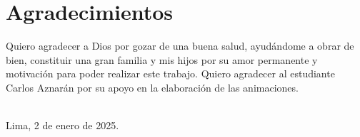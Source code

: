 \section*{Agradecimientos}

Quiero agradecer a Dios por gozar de una buena salud, ayudándome a
obrar de bien, constituir una gran familia y mis hijos por su amor
permanente y motivación para poder realizar este trabajo.
Quiero agradecer al estudiante Carlos Aznarán por su apoyo en la
elaboración de las animaciones.

\begin{flushright}
  \nameone \\
  Lima, 2 de enero de 2025.
\end{flushright}
